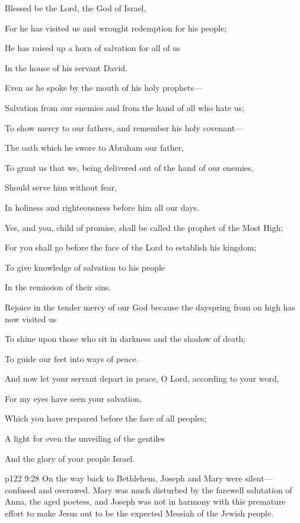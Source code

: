 \begin{quoting}[vskip=\baselineskip,leftmargin=4ex,rightmargin=2ex]
\setlength{\parindent}{-0.7em}
\makeatletter{}\makeatother%
\hspace*{-1.2em} Blessed be the Lord, the God of Israel,\par
For he has visited us and wrought redemption for his people;\par
He has raised up a horn of salvation for all of us\par
In the house of his servant David.\par
Even as he spoke by the mouth of his holy prophets---\par
Salvation from our enemies and from the hand of all who hate us;\par
To show mercy to our fathers, and remember his holy covenant---\par
The oath which he swore to Abraham our father,\par
To grant us that we, being delivered out of the hand of our enemies,\par
Should serve him without fear,\par
In holiness and righteousness before him all our days.\par
Yes, and you, child of promise, shall be called the prophet of the Most High;\par
For you shall go before the face of the Lord to establish his kingdom;\par
To give knowledge of salvation to his people\par
In the remission of their sins.\par
Rejoice in the tender mercy of our God because the dayspring from on high has now visited us\par
To shine upon those who sit in darkness and the shadow of death;\par
To guide our feet into ways of peace.\par
And now let your servant depart in peace, O Lord, according to your word,\par
For my eyes have seen your salvation,\par
Which you have prepared before the face of all peoples;\par
A light for even the unveiling of the gentiles\par
And the glory of your people Israel.\par
\end{quoting}
\pc \vs p122 9:28 On the way back to Bethlehem, Joseph and Mary were silent---confused and overawed. Mary was much disturbed by the farewell salutation of Anna, the aged poetess, and Joseph was not in harmony with this premature effort to make Jesus out to be the expected Messiah of the Jewish people.\plusone
